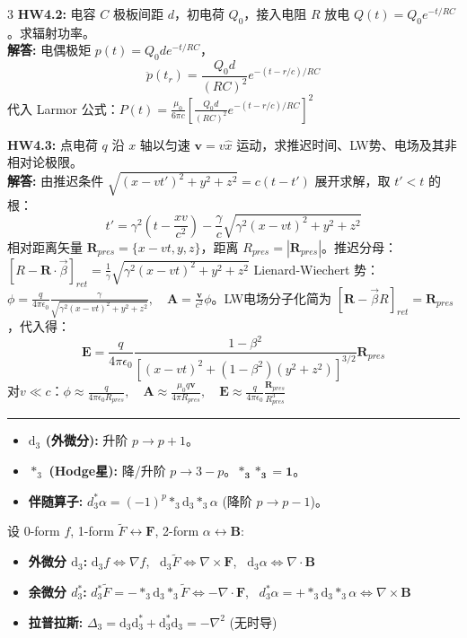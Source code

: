 \documentclass[9pt,a4paper]{article} %
\newcommand{\diff}{\mathrm{d}}
\newcommand{\mbf}[1]{\mathbf{#1}}
\begin{document}
\begin{multicols*}{3}
\vspace{0.5ex}
\noindent\textbf{HW4.2:} 电容 $C$ 极板间距 $d$，初电荷 $Q_0$，接入电阻 $R$ 放电 $Q(t)=Q_0 e^{-t/RC}$。求辐射功率。\\
\textbf{解答:} 电偶极矩 $p(t) = Q_0 d e^{-t/RC}$，
$$ \ddot{p}(t_r) = \frac{Q_0 d}{(RC)^2} e^{-(t - r/c)/RC} $$
代入 Larmor 公式：$P(t) = \frac{\mu_0}{6\pi c} \left[ \frac{Q_0 d}{(RC)^2} e^{-(t - r/c)/RC} \right]^2$

\vspace{0.5ex}
\noindent\textbf{HW4.3:} 点电荷 $q$ 沿 $x$ 轴以匀速 $\mathbf{v}=v\hat{x}$ 运动，求推迟时间、LW势、电场及其非相对论极限。\\
\textbf{解答:} 由推迟条件 $\sqrt{(x-vt')^2+y^2+z^2}=c(t-t')$ 展开求解，取 $t'<t$ 的根：
$$t' = \gamma^2\left(t - \frac{xv}{c^2}\right) - \frac{\gamma}{c}\sqrt{\gamma^2(x - vt)^2 + y^2 + z^2}$$
相对距离矢量 $\mathbf{R}_{pres} = \{x-vt, y, z\}$，距离 $R_{pres} = |\mathbf{R}_{pres}|$。推迟分母：
$[R - \mathbf{R}\cdot\vec{\beta}]_{ret} = \frac{1}{\gamma}\sqrt{\gamma^2(x-vt)^2 + y^2 + z^2}$
Lienard-Wiechert 势：$\phi = \frac{q}{4\pi\epsilon_0} \frac{\gamma}{\sqrt{\gamma^2(x-vt)^2 + y^2 + z^2}}, \quad \mathbf{A} = \frac{\mathbf{v}}{c^2}\phi$。LW电场分子化简为 $[\mathbf{R}-\vec{\beta}R]_{ret} = \mathbf{R}_{pres}$，代入得：
$$\mathbf{E} = \frac{q}{4\pi\epsilon_0} \frac{1-\beta^2}{\left[(x-vt)^2 + (1-\beta^2)(y^2+z^2)\right]^{3/2}} \mathbf{R}_{pres}$$
对$v \ll c$：$\phi \approx \frac{q}{4\pi\epsilon_0 R_{pres}}, \quad \mathbf{A} \approx \frac{\mu_0 q \mathbf{v}}{4\pi R_{pres}}, \quad \mathbf{E} \approx \frac{q}{4\pi\epsilon_0}\frac{\mathbf{R}_{pres}}{R_{pres}^3}$

\vspace{1ex}\hrule\vspace{1ex}
\begin{itemize}
    \item \textbf{$\diff_3$ (外微分):} 升阶 $p \to p+1$。
    \item \textbf{$*_3$ (Hodge星):} 降/升阶 $p \to 3-p$。$\mathbf{*_3 *_3 = 1}$。
    \item \textbf{伴随算子:} $d_3^* \alpha = (-1)^p *_3 \diff_3 *_3 \alpha$ (降阶 $p \to p-1$)。
\end{itemize}
设 0-form $f$, 1-form $\tilde{F} \leftrightarrow \mbf{F}$, 2-form $\alpha \leftrightarrow \mbf{B}$:
\begin{itemize}
    \item \textbf{外微分 $\diff_3$:} $\diff_3 f \iff \nabla f$, \ $\diff_3 \tilde{F} \iff \nabla \times \mbf{F}$, \ $\diff_3 \alpha \iff \nabla \cdot \mbf{B}$
    \item \textbf{余微分 $d_3^*$:} $d_3^* \tilde{F} = -*_3 \diff_3 *_3 \tilde{F} \iff -\nabla \cdot \mbf{F}$, \ $d_3^* \alpha = +*_3 \diff_3 *_3 \alpha \iff \nabla \times \mbf{B}$
    \item \textbf{拉普拉斯:} $\Delta_3 = \diff_3\diff_3^* + \diff_3^*\diff_3 = -\nabla^2$ (无时导)
\end{itemize}


\end{multicols*}
\end{document}
